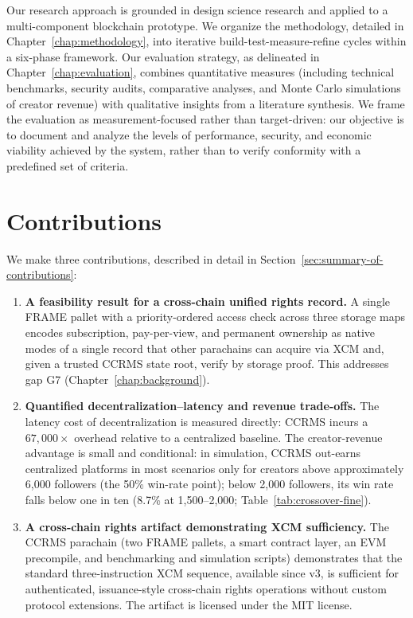 Our research approach is grounded in design science research \citep{hevnerEtAl2004} and applied to a multi-component blockchain prototype. We organize the methodology, detailed in Chapter~\ref{chap:methodology}, into iterative build-test-measure-refine cycles within a six-phase framework. Our evaluation strategy, as delineated in Chapter~\ref{chap:evaluation}, combines quantitative measures (including technical benchmarks, security audits, comparative analyses, and Monte Carlo simulations of creator revenue) with qualitative insights from a literature synthesis. We frame the evaluation as measurement-focused rather than target-driven: our objective is to document and analyze the levels of performance, security, and economic viability achieved by the system, rather than to verify conformity with a predefined set of criteria.

\section{Contributions}\label{sec:contributions}

We make three contributions, described in detail in Section~\ref{sec:summary-of-contributions}:

\begin{enumerate}

\item \textbf{A feasibility result for a cross-chain unified rights record.} A single FRAME pallet with a priority-ordered access check across three storage maps encodes subscription, pay-per-view, and permanent ownership as native modes of a single record that other parachains can acquire via XCM and, given a trusted CCRMS state root, verify by storage proof. This addresses gap G7 (Chapter~\ref{chap:background}).

\item \textbf{Quantified decentralization--latency and revenue trade-offs.} The latency cost of decentralization is measured directly: CCRMS incurs a $67{,}000\times$ overhead relative to a centralized baseline. The creator-revenue advantage is small and conditional: in simulation, CCRMS out-earns centralized platforms in most scenarios only for creators above approximately 6,000 followers (the 50\% win-rate point); below 2,000 followers, its win rate falls below one in ten (8.7\% at 1,500--2,000; Table~\ref{tab:crossover-fine}).

\item \textbf{A cross-chain rights artifact demonstrating XCM sufficiency.} The CCRMS parachain (two FRAME pallets, a smart contract layer, an EVM precompile, and benchmarking and simulation scripts) demonstrates that the standard three-instruction XCM sequence, available since v3, is sufficient for authenticated, issuance-style cross-chain rights operations without custom protocol extensions. The artifact is licensed under the MIT license.

\end{enumerate}

